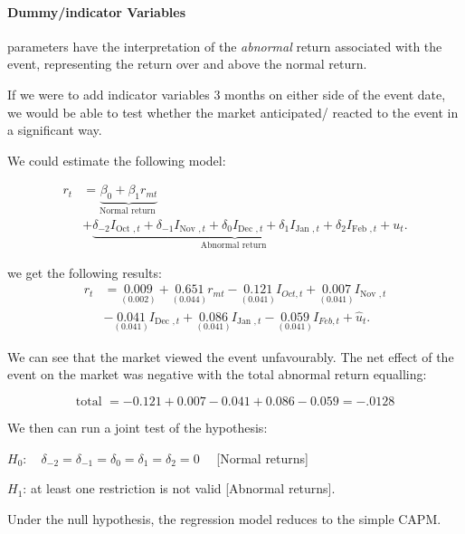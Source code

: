\documentclass[11pt]{article}
\begin{document}
 \paragraph{Dummy/indicator Variables} parameters have the interpretation of the \textit{abnormal} return associated with the event, representing the return over and above the normal return.

 If we were to add indicator variables 3 months on either side of the event date, we would be able to test whether the market anticipated/ reacted to the event in a significant way.

 We could estimate the following model:

 \begin{equation}
\begin{aligned}
r_t & =\underbrace{\beta_0+\beta_1 r_{m t}}_{\text {Normal return }} \\
& +\underbrace{\delta_{-2} I_{\text {Oct }, t}+\delta_{-1} I_{\text {Nov }, t}+\delta_0 I_{\text {Dec }, t}+\delta_1 I_{\text {Jan }, t}+\delta_2 I_{\text {Feb }, t}}_{\text {Abnormal return }}+u_t .
\end{aligned}
\end{equation}

we get the following results:
\begin{equation}
\begin{aligned}
r_t & =\underset{(0.002)}{0.009}+\underset{(0.044)}{0.651} r_{m t}-\underset{(0.041)}{0.121} I_{O c t, t}+\underset{(0.041)}{0.007} I_{\text {Nov }, t} \\
& -\underset{(0.041)}{0.041} I_{\text {Dec }, t}+\underset{(0.041)}{0.086} I_{\text {Jan }, t}-\underset{(0.041)}{0.059} I_{F e b, t}+\widehat{u}_t .
\end{aligned}
\end{equation}

We can see that the market viewed the event unfavourably. The net effect of the event on the market was negative with the total abnormal return equalling:

\[\text{total } = -0.121 + 0.007 - 0.041 + 0.086 - 0.059 = -.0128\]

We then can run a joint test of the hypothesis:

$H_0: \quad \delta_{-2}=\delta_{-1}=\delta_0=\delta_1=\delta_2=0 \quad$ [Normal returns]

$H_1$: at least one restriction is not valid [Abnormal returns].

Under the null hypothesis, the regression model reduces to the simple CAPM.
\end{document}
